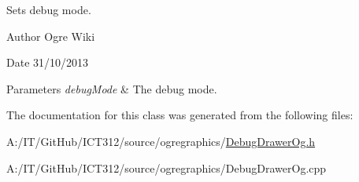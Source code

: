 Sets debug mode. 

\begin{DoxyAuthor}{Author}
Ogre Wiki 
\end{DoxyAuthor}
\begin{DoxyDate}{Date}
31/10/2013
\end{DoxyDate}

\begin{DoxyParams}{Parameters}
{\em debug\-Mode} & The debug mode. \\
\hline
\end{DoxyParams}


The documentation for this class was generated from the following files\-:\begin{DoxyCompactItemize}
\item 
A\-:/\-I\-T/\-Git\-Hub/\-I\-C\-T312/source/ogregraphics/\hyperlink{_debug_drawer_og_8h}{Debug\-Drawer\-Og.\-h}\item 
A\-:/\-I\-T/\-Git\-Hub/\-I\-C\-T312/source/ogregraphics/Debug\-Drawer\-Og.\-cpp\end{DoxyCompactItemize}
